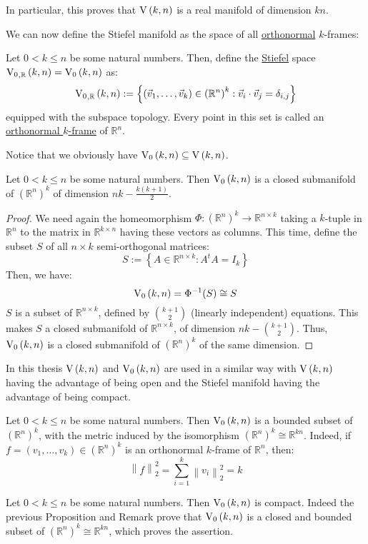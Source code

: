 \begin{remark} In particular, this proves that $\St{k}{n}$ is a real manifold of dimension $kn$.
\end{remark}

We can now define the Stiefel manifold as the space of all \ul{orthonormal} $k$-frames:
\begin{definition} Let $0<k\leq n$ be some natural numbers. Then, define the \ul{Stiefel} space $\StO{k}{n}{\mathbb{R}}=\StO{k}{n}$ as:
\[\StO{k}{n}{\mathbb{R}}:=\left\{\left(\vec{v}_1,\ldots,\vec{v}_k\right)\in{\left(\mathbb{R}^n\right)}^k:\vec{v}_i\cdot\vec{v}_j=\delta_{i,j}\right\}\]
equipped with the subspace topology. Every point in this set is called an \ul{orthonormal $k$-frame} of $\mathbb{R}^n$.
\end{definition}
Notice that we obviously have $\StO{k}{n}\subseteq\St{k}{n}$.

\begin{proposition}\label{prop:StO_dim_closed} Let $0<k\leq n$ be some natural numbers. Then $\StO{k}{n}$ is a closed submanifold of ${\left(\mathbb{R}^n\right)}^k$ of dimension $nk-\frac{k(k+1)}{2}$.
\end{proposition}

\begin{proof}
We need again the homeomorphism $\Phi:{\left(\mathbb{R}^n\right)}^k\to\mathbb{R}^{n\times k}$ taking a $k$-tuple in $\mathbb{R}^n$ to the matrix in $\mathbb{R}^{k\times n}$ having these vectors as columns. This time, define the subset $S$ of all $n\times k$ semi-orthogonal matrices:
\[S:=\left\{A\in\mathbb{R}^{n\times k}:A^t A=I_k\right\}\]
Then, we have:
\[\StO{k}{n}=\Phi^{-1}(S)\cong S\]
$S$ is a subset of $\mathbb{R}^{n\times k}$, defined by $\binom{k+1}{2}$ (linearly independent) equations. This makes $S$ a closed submanifold of $\mathbb{R}^{n\times k}$, of dimension $nk-\binom{k+1}{2}$. Thus, $\StO{k}{n}$ is a closed submanifold of ${\left(\mathbb{R}^n\right)}^k$ of the same dimension.
\end{proof}

In this thesis $\St{k}{n}$ and $\StO{k}{n}$ are used in a similar way with $\St{k}{n}$ having the advantage of being open and the Stiefel manifold having the advantage of being compact.
\begin{remark} Let $0<k\leq n$ be some natural numbers. Then $\StO{k}{n}$ is a bounded subset of ${\left(\mathbb{R}^n\right)}^k$, with the metric induced by the isomorphism ${\left(\mathbb{R}^n\right)}^k\cong\mathbb{R}^{kn}$. Indeed, if $f=(v_1,\ldots,v_k)\in{\left(\mathbb{R}^n\right)}^k$ is an orthonormal $k$-frame of $\mathbb{R}^n$, then:
\[\left\|f\right\|_2^2=\sum_{i=1}^k\left\|v_i\right\|_2^2=k\]
\end{remark}

\begin{lemma}\label{lem:StO_compact} Let $0<k\leq n$ be some natural numbers. Then $\StO{k}{n}$ is compact. Indeed the previous Proposition and Remark prove that $\StO{k}{n}$ is a closed and bounded subset of ${\left(\mathbb{R}^n\right)}^k\cong\mathbb{R}^{kn}$, which proves the assertion.
\end{lemma}


